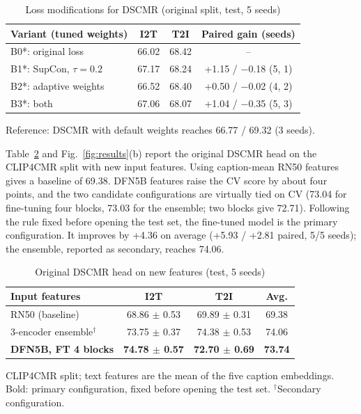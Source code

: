 \documentclass[conference]{IEEEtran}
\begin{document}
\begin{table}[t]
\centering
\caption{Loss modifications for DSCMR (original split, test, 5 seeds)}
\label{tab:dscmrloss}
\small
\begin{tabular*}{\columnwidth}{@{\extracolsep{\fill}}lccc@{}}
\toprule
Variant (tuned weights) & I2T & T2I & Paired gain (seeds) \\
\midrule
B0*: original loss & 66.02 & 68.42 & -- \\
B1*: SupCon, $\tau = 0.2$ & 67.17 & 68.24 & +1.15 / $-$0.18 (5, 1) \\
B2*: adaptive weights & 66.52 & 68.40 & +0.50 / $-$0.02 (4, 2) \\
B3*: both & 67.06 & 68.07 & +1.04 / $-$0.35 (5, 3) \\
\bottomrule
\end{tabular*}

\vspace{2pt}
\parbox{\columnwidth}{\footnotesize Reference: DSCMR with default weights reaches 66.77 / 69.32 (3 seeds).}
\end{table}

Table~\ref{tab:dscmrfeat} and Fig.~\ref{fig:results}(b) report the original DSCMR head on the CLIP4CMR split with new input features. Using caption-mean RN50 features gives a baseline of 69.38. DFN5B features raise the CV score by about four points, and the two candidate configurations are virtually tied on CV (73.04 for fine-tuning four blocks, 73.03 for the ensemble; two blocks give 72.71). Following the rule fixed before opening the test set, the fine-tuned model is the primary configuration. It improves by +4.36 on average (+5.93 / +2.81 paired, 5/5 seeds); the ensemble, reported as secondary, reaches 74.06.

\begin{table}[t]
\centering
\caption{Original DSCMR head on new features (test, 5 seeds)}
\label{tab:dscmrfeat}
\small
\setlength{\tabcolsep}{4pt}
\begin{tabular*}{\columnwidth}{@{\extracolsep{\fill}}lccc@{}}
\toprule
Input features & I2T & T2I & Avg. \\
\midrule
RN50 (baseline) & 68.86 $\pm$ 0.53 & 69.89 $\pm$ 0.31 & 69.38 \\
3-encoder ensemble$^\dagger$ & 73.75 $\pm$ 0.37 & 74.38 $\pm$ 0.53 & 74.06 \\
\textbf{DFN5B, FT 4 blocks} & \textbf{74.78 $\pm$ 0.57} & \textbf{72.70 $\pm$ 0.69} & \textbf{73.74} \\
\bottomrule
\end{tabular*}

\vspace{2pt}
\parbox{\columnwidth}{\footnotesize CLIP4CMR split; text features are the mean of the five caption embeddings. Bold: primary configuration, fixed before opening the test set. $^\dagger$Secondary configuration.}
\end{table}
\end{document}
